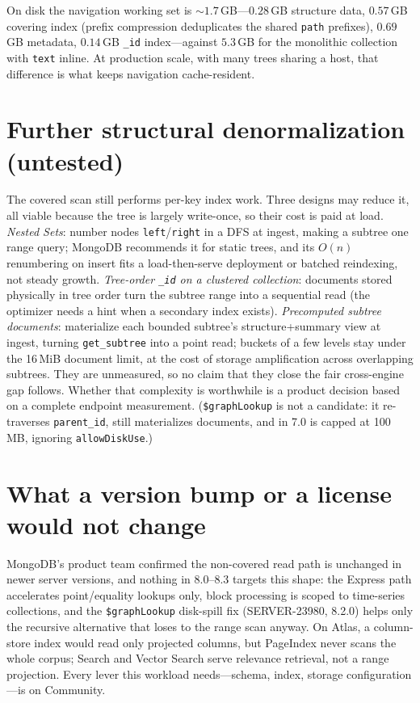\documentclass[11pt]{article}
\newcommand{\code}[1]{\texttt{#1}}
\begin{document}
On disk the navigation working set is ${\sim}1.7$\,GB---$0.28$\,GB structure
data, $0.57$\,GB covering index (prefix compression deduplicates the shared
\code{path} prefixes), $0.69$\,GB metadata, $0.14$\,GB \code{\_id}
index---against $5.3$\,GB for the monolithic collection with \code{text}
inline. At production scale, with many trees sharing a host, that difference is
what keeps navigation cache-resident.

\section{Further structural denormalization (untested)}

The covered scan still performs per-key index work. Three designs may reduce it,
all viable because the tree is largely write-once,
so their cost is paid at load. \emph{Nested Sets}: number nodes
\code{left}/\code{right} in a DFS at ingest, making a subtree one range query;
MongoDB recommends it for static trees, and its $O(n)$ renumbering on insert
fits a load-then-serve deployment or batched reindexing, not steady growth.
\emph{Tree-order \code{\_id} on a clustered collection}: documents stored
physically in tree order turn the subtree range into a sequential read (the
optimizer needs a hint when a secondary index exists). \emph{Precomputed subtree
documents}: materialize each bounded subtree's structure+summary view at ingest,
turning \code{get\_subtree} into a point read; buckets of a few levels stay
under the 16\,MiB document limit, at the cost of storage amplification across
overlapping subtrees. They are unmeasured, so no claim that they close the fair
cross-engine gap follows. Whether that complexity is worthwhile is a product
decision based on a complete endpoint measurement. (\code{\$graphLookup} is not a candidate: it re-traverses
\code{parent\_id}, still materializes documents, and in 7.0 is capped at
100\,MB, ignoring \code{allowDiskUse}.)

\section{What a version bump or a license would not change}

MongoDB's product team confirmed the non-covered read path is unchanged in
newer server versions, and nothing in 8.0--8.3 targets this shape: the Express
path accelerates point/equality lookups only, block processing is scoped to
time-series collections, and the \code{\$graphLookup} disk-spill fix
(SERVER-23980, 8.2.0) helps only the recursive alternative that loses to the
range scan anyway. On Atlas, a column-store index would read only projected
columns, but PageIndex never scans the whole corpus; Search and Vector Search
serve relevance retrieval, not a range projection. Every lever this workload
needs---schema, index, storage configuration---is on Community.
\end{document}

